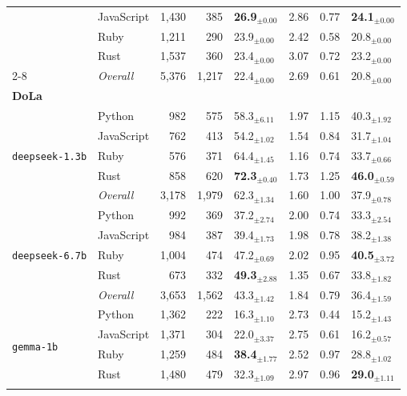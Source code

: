 \begin{longtable}{@{}llrrp{0.72cm}rrp{0.72cm}@{}}
       & JavaScript & 1,430 & 385 & \textbf{26.9$_{\pm 0.00}$} & 2.86 & 0.77 & \textbf{24.1$_{\pm 0.00}$} \\
       & Ruby & 1,211 & 290 & 23.9$_{\pm 0.00}$ & 2.42 & 0.58 & 20.8$_{\pm 0.00}$ \\
       & Rust & 1,537 & 360 & 23.4$_{\pm 0.00}$ & 3.07 & 0.72 & 23.2$_{\pm 0.00}$ \\ \cmidrule(lr){2-8}
      & \textit{Overall} & 5,376 & 1,217 & 22.4$_{\pm 0.00}$ & 2.69 & 0.61 & 20.8$_{\pm 0.00}$ \\
  \midrule[1.2pt]
  \multicolumn{8}{l}{\textbf{\small DoLa}} \\
  \midrule
      \multirow{5}{*}{\texttt{deepseek-1.3b}} & Python & 982 & 575 & 58.3$_{\pm 6.11}$ & 1.97 & 1.15 & 40.3$_{\pm 1.92}$ \\
       & JavaScript & 762 & 413 & 54.2$_{\pm 1.02}$ & 1.54 & 0.84 & 31.7$_{\pm 1.04}$ \\
       & Ruby & 576 & 371 & 64.4$_{\pm 1.45}$ & 1.16 & 0.74 & 33.7$_{\pm 0.66}$ \\
       & Rust & 858 & 620 & \textbf{72.3$_{\pm 0.40}$} & 1.73 & 1.25 & \textbf{46.0$_{\pm 0.59}$} \\ \cmidrule(lr){2-8}
      & \textit{Overall} & 3,178 & 1,979 & 62.3$_{\pm 1.34}$ & 1.60 & 1.00 & 37.9$_{\pm 0.78}$ \\
    \midrule
      \multirow{5}{*}{\texttt{deepseek-6.7b}} & Python & 992 & 369 & 37.2$_{\pm 2.74}$ & 2.00 & 0.74 & 33.3$_{\pm 2.54}$ \\
       & JavaScript & 984 & 387 & 39.4$_{\pm 1.73}$ & 1.98 & 0.78 & 38.2$_{\pm 1.38}$ \\
       & Ruby & 1,004 & 474 & 47.2$_{\pm 0.69}$ & 2.02 & 0.95 & \textbf{40.5$_{\pm 3.72}$} \\
       & Rust & 673 & 332 & \textbf{49.3$_{\pm 2.88}$} & 1.35 & 0.67 & 33.8$_{\pm 1.82}$ \\ \cmidrule(lr){2-8}
      & \textit{Overall} & 3,653 & 1,562 & 43.3$_{\pm 1.42}$ & 1.84 & 0.79 & 36.4$_{\pm 1.59}$ \\
    \midrule
      \multirow{5}{*}{\texttt{gemma-1b}} & Python & 1,362 & 222 & 16.3$_{\pm 1.10}$ & 2.73 & 0.44 & 15.2$_{\pm 1.43}$ \\
       & JavaScript & 1,371 & 304 & 22.0$_{\pm 3.37}$ & 2.75 & 0.61 & 16.2$_{\pm 0.57}$ \\
       & Ruby & 1,259 & 484 & \textbf{38.4$_{\pm 1.77}$} & 2.52 & 0.97 & 28.8$_{\pm 1.02}$ \\
       & Rust & 1,480 & 479 & 32.3$_{\pm 1.09}$ & 2.97 & 0.96 & \textbf{29.0$_{\pm 1.11}$} \\ \cmidrule(lr){2-8}

\end{longtable}
